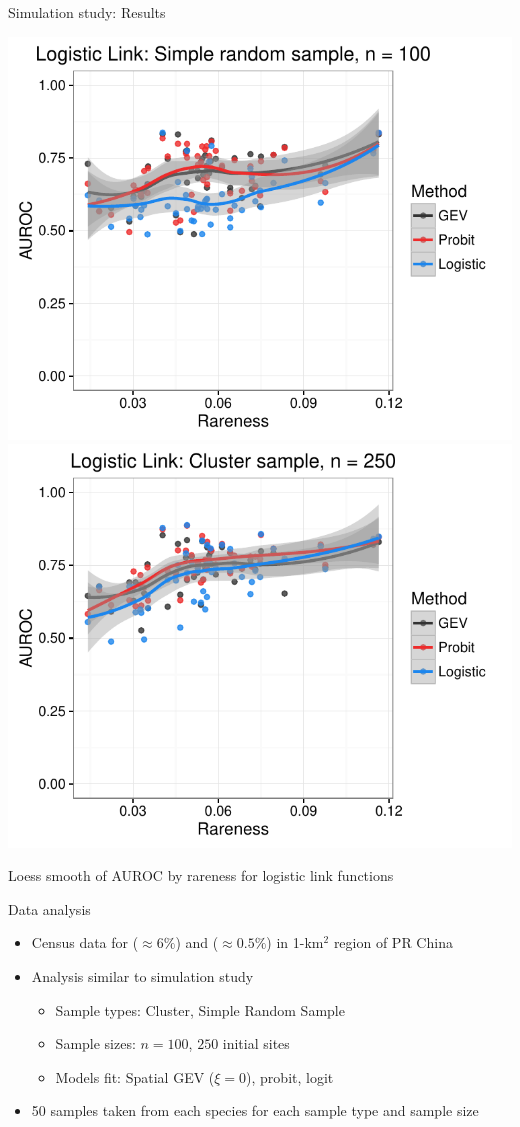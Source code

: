 \documentclass{beamer}
\begin{document}
\begin{frame}{Simulation study: Results}
  \begin{center}
    \includegraphics[width=0.49\linewidth]{byrareness-6}
    \includegraphics[width=0.49\linewidth]{byrareness-7}

    Loess smooth of AUROC by rareness for logistic link functions
  \end{center}
\end{frame}

\begin{frame}{Data analysis}
	\begin{itemize}\setlength{\itemsep}{1em}
		\item Census data for \tamarix{} ($\approx 6\%$) and \hedysarum{} ($\approx 0.5\%$) in 1-km$^2$ region of PR China
		\item Analysis similar to simulation study
		\begin{itemize} \setlength{\itemsep}{0.5em}
			\item Sample types: Cluster, Simple Random Sample
			\item Sample sizes: $n = 100$, $250$ initial sites
			\item Models fit: Spatial GEV ($\xi = 0$), probit, logit
		\end{itemize}
		\item 50 samples taken from each species for each sample type and sample size
	\end{itemize}
\end{frame}
\end{document}
